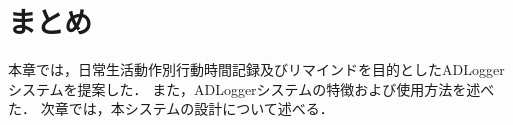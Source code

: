 

\section{まとめ}
本章では，日常生活動作別行動時間記録及びリマインドを目的としたADLoggerシステムを提案した．
また，ADLoggerシステムの特徴および使用方法を述べた．
次章では，本システムの設計について述べる．
